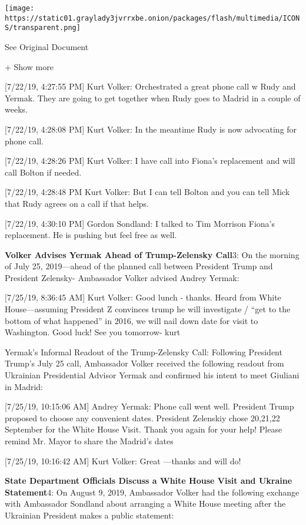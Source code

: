 \protect\hyperlink{}{}

\texttt{[image: https://static01.graylady3jvrrxbe.onion/packages/flash/multimedia/ICONS/transparent.png]}

See Original Document

+ Show more

{[}7/22/19, 4:27:55 PM{]} Kurt Volker: Orchestrated a great phone call w
Rudy and Yermak. They are going to get together when Rudy goes to Madrid
in a couple of weeks.

{[}7/22/19, 4:28:08 PM{]} Kurt Volker: In the meantime Rudy is now
advocating for phone call.

{[}7/22/19, 4:28:26 PM{]} Kurt Volker: I have call into Fiona's
replacement and will call Bolton if needed.

{[}7/22/19, 4:28:48 PM Kurt Volker: But I can tell Bolton and you can
tell Mick that Rudy agrees on a call if that helps.

{[}7/22/19, 4:30:10 PM{]} Gordon Sondland: I talked to Tim Morrison
Fiona's replacement. He is pushing but feel free as well.

\textbf{Volker Advises Yermak Ahead of Trump-Zelensky Call}3: On the
morning of July 25, 2019---ahead of the planned call between President
Trump and President Zelensky- Ambassador Volker advised Andrey Yermak:

{[}7/25/19, 8:36:45 AM{]} Kurt Volker: Good lunch - thanks. Heard from
White House---assuming President Z convinces trump he will investigate /
``get to the bottom of what happened'' in 2016, we will nail down date
for visit to Washington. Good luck! See you tomorrow- kurt

Yermak's Informal Readout of the Trump-Zelensky Call: Following
President Trump's July 25 call, Ambassador Volker received the following
readout from Ukrainian Presidential Advisor Yermak and confirmed his
intent to meet Giuliani in Madrid:

{[}7/25/19, 10:15:06 AM{]} Andrey Yermak: Phone call went well.
President Trump proposed to choose any convenient dates. President
Zelenskiy chose 20,21,22 September for the White House Visit. Thank you
again for your help! Please remind Mr. Mayor to share the Madrid's dates

{[}7/25/19, 10:16:42 AM{]} Kurt Volker: Great ---thanks and will do!

\textbf{State Department Officials Discuss a White House Visit and
Ukraine Statement}4: On August 9, 2019, Ambassador Volker had the
following exchange with Ambassador Sondland about arranging a White
House meeting after the Ukrainian President makes a public statement:

